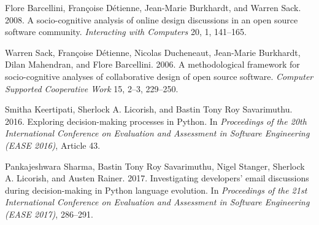 Flore Barcellini, Fran\c{c}oise D\'etienne, Jean-Marie Burkhardt, and Warren Sack. 2008. A socio-cognitive analysis of online design discussions in an open source software community. \emph{Interacting with Computers} 20, 1, 141--165.

Warren Sack, Fran\c{c}oise D\'etienne, Nicolas Ducheneaut, Jean-Marie Burkhardt, Dilan Mahendran, and Flore Barcellini. 2006. A methodological framework for socio-cognitive analyses of collaborative design of open source software. \emph{Computer Supported Cooperative Work} 15, 2--3, 229--250.

Smitha Keertipati, Sherlock A. Licorish, and Bastin Tony Roy Savarimuthu. 2016. Exploring decision-making processes in Python. In \emph{Proceedings of the 20th International Conference on Evaluation and Assessment in Software Engineering (EASE 2016)}, Article 43.

Pankajeshwara Sharma, Bastin Tony Roy Savarimuthu, Nigel Stanger, Sherlock A. Licorish, and Austen Rainer. 2017. Investigating developers' email discussions during decision-making in Python language evolution. In \emph{Proceedings of the 21st International Conference on Evaluation and Assessment in Software Engineering (EASE 2017)}, 286--291.
